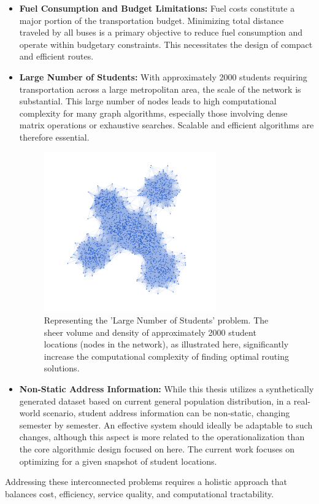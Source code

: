\begin{itemize}
    \item \textbf{Fuel Consumption and Budget Limitations:} Fuel costs constitute a major portion of the transportation budget. Minimizing total distance traveled by all buses is a primary objective to reduce fuel consumption and operate within budgetary constraints. This necessitates the design of compact and efficient routes.

    \item \textbf{Large Number of Students:} With approximately 2000 students requiring transportation across a large metropolitan area, the scale of the network is substantial. This large number of nodes leads to high computational complexity for many graph algorithms, especially those involving dense matrix operations or exhaustive searches. Scalable and efficient algorithms are therefore essential.
    \begin{figure}[!htbp]
        \centering
        \includegraphics[width=0.7\textwidth]{img/large_scale_students.png}
        \caption{Representing the 'Large Number of Students' problem. The sheer volume and density of approximately 2000 student locations (nodes in the network), as illustrated here, significantly increase the computational complexity of finding optimal routing solutions.}
        \label{fig:problem_large_scale}
    \end{figure}

    \item \textbf{Non-Static Address Information:} While this thesis utilizes a synthetically generated dataset based on current general population distribution, in a real-world scenario, student address information can be non-static, changing semester by semester. An effective system should ideally be adaptable to such changes, although this aspect is more related to the operationalization than the core algorithmic design focused on here. The current work focuses on optimizing for a given snapshot of student locations.
\end{itemize}
Addressing these interconnected problems requires a holistic approach that balances cost, efficiency, service quality, and computational tractability.

